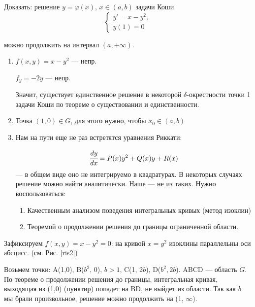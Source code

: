\begin{example}
    Доказать: решение $y = \varphi(x)$, $x \in (a,b)$ задачи Коши
    \begin{equation*}
        \begin{cases}
        y' = x - y^2, 
        \\
        y(1) = 0
        \end{cases}
    \end{equation*}
    
    можно продолжить на интервал $(a, +\infty)$.
    
    \begin{enumerate}
        \item $f(x,y) = x - y^2$ --- непр.
        
        $f_y = -2y$ --- непр.
        
        Значит, существует единственное решение в некоторой $\delta$-окрестности точки 1  задачи Коши по теореме о существовании и единственности.
        
        \item Точка $(1,0) \in G$, для этого нужно, чтобы $x_0\in(a,b)$
        
        \item Нам на пути еще не раз встретятся уравнения Риккати:
        
        \begin{equation*}
            \cfrac{dy}{dx} = P(x)y^2 + Q(x)y + R(x)
        \end{equation*}
        --- в общем виде оно не интегрируемо в квадратурах. В некоторых случаях решение можно найти аналитически. Наше --- не из таких. Нужно воспользоваться:
            \begin{enumerate} 
            \item Качественным анализом поведения интегральных кривых (метод изоклин)
            \item Теоремой о продолжении решения до границы ограниченной области.
             \end{enumerate}
    \end{enumerate}   
    
    Зафиксируем $f(x,y) = x - y^2 = 0$: на кривой $x = y^2$ изоклины параллельны оси абсцисс. (см. Рис. \ref{ris2})
    
    Возьмем точки: A(1,0), B($b^2$, 0), $b > 1$, C(1, 2$b$), D($b^2, 2b$). ABCD --- область $G$. По теореме о продолжении решения до границы, интегральная кривая, выходящая из (1,0) (пунктир) попадет на BD, не выйдет из области. Так как $b$ мы брали произвольное, решение можно продолжить на (1, $\infty$).
\end{example}

